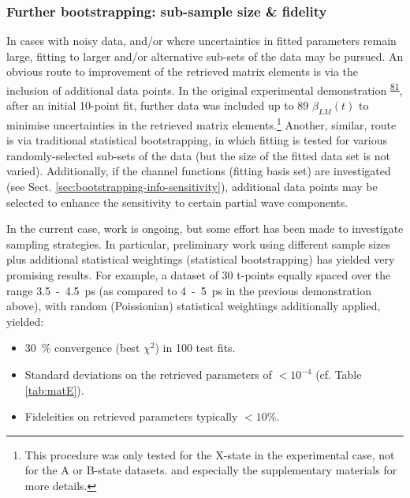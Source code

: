 \documentclass[10pt]{article}
\begin{document}


\subsubsection{Further bootstrapping: sub-sample size \& fidelity}

In cases with noisy data, and/or where uncertainties in fitted parameters remain large, fitting to larger and/or alternative sub-sets of the data may be pursued.
An obvious route to improvement of the retrieved matrix elements is via the inclusion of additional data points. In the original experimental demonstration \textsuperscript{\hyperref[csl:81]{81}}, after an initial 10-point fit, further data was included up to 89 $\beta_{LM}(t)$ to minimise uncertainties in the retrieved matrix elements.\footnote{This procedure was only tested for the X-state in the experimental case, not for the A or B-state datasets. %
and especially the supplementary materials for more details.} Another, similar, route is via traditional statistical bootstrapping, in which fitting is tested for various randomly-selected sub-sets of the data (but the size of the fitted data set is not varied). Additionally, if the channel functions (fitting basis set) are investigated (see Sect. \ref{sec:bootstrapping-info-sensitivity}), additional data points may be selected to enhance the sensitivity to certain partial wave components.

In the current case, work is ongoing, %
but some effort has been made to investigate sampling strategies. In particular, preliminary work using different sample sizes plus additional statistical weightings (statistical bootstrapping) has yielded very promising results. For example, a dataset of 30 t-points equally spaced over the range 3.5~-~4.5~ps (as compared to 4~-~5~ps in the previous demonstration above), with random (Poissionian) statistical weightings additionally applied, yielded:

\begin{itemize}
\item 30~\% convergence (best $\chi^2$) in 100 test fits.
\item Standard deviations on the retrieved parameters of $<10^{-4}$ (cf. Table \ref{tab:matE}).
\item Fideleities on retrieved parameters typically $<10\%$.
\end{itemize}
\end{document}
